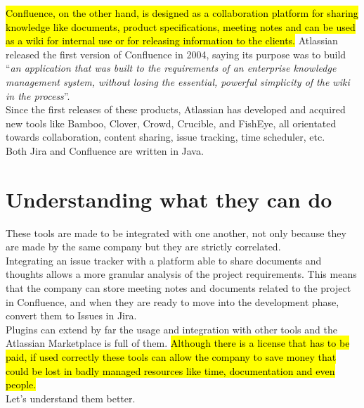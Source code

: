 	\hl{Confluence, on the other hand, is designed as a collaboration platform for sharing knowledge like documents, product specifications, meeting notes and can be used as a wiki for internal use or for releasing information to the clients.}	
	Atlassian released the first version of Confluence in 2004, saying its purpose was to build ``\textit{an application that was built to the requirements of an enterprise knowledge management system, without losing the essential, powerful simplicity of the wiki in the process}''.\\
	Since the first releases of these products, Atlassian has developed and acquired new tools like Bamboo, Clover, Crowd, Crucible, and FishEye, all orientated towards collaboration, content sharing, issue tracking, time scheduler, etc.\\
	Both Jira and Confluence are written in Java.

\section{Understanding what they can do}
	These tools are made to be integrated with one another, not only because they are made by the same company but they are strictly correlated.\\
	Integrating an issue tracker with a platform able to share documents and thoughts allows a more granular analysis of the project requirements.
	This means that the company can store meeting notes and documents related to the project in Confluence, and when they are ready to move into the development phase, convert them to Issues in Jira.\\
	Plugins can extend by far the usage and integration with other tools and the Atlassian Marketplace is full of them.
	\hl{Although there is a license that has to be paid, if used correctly these tools can allow the company to save money that could be lost in badly managed resources like time, documentation and even people.}\\
	Let's understand them better.
	
